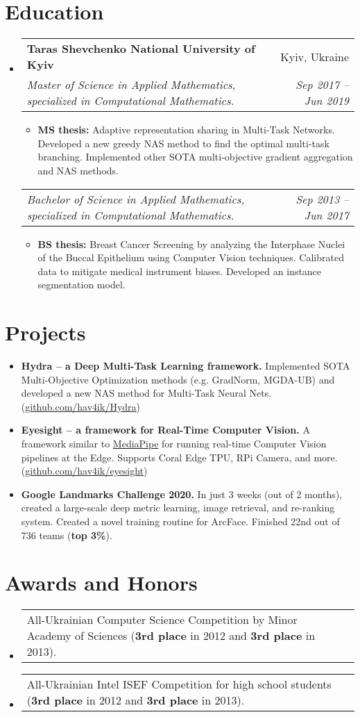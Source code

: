 \documentclass[letterpaper,11pt]{article}
\makeatletter
\newcommand{\resumeItemWithHeader}[2]{
  \item[--]\small{
    \textbf{#1}{ #2 \vspace{-2pt}}
  }
}
\newcommand{\awardsCustomItem}[2]{
  \item[--]
  \begin{tabular*}{0.97\textwidth}{l@{\extracolsep{\fill}}r}
    {\small#1} & \textit{\small#2} \\
  \end{tabular*}\vspace{-7.5pt}
}
\newcommand{\resumeSubheading}[4]{
  \vspace{-1pt}\item
    \begin{tabular*}{0.97\textwidth}{l@{\extracolsep{\fill}}r}
      \textbf{#1} & #2 \\
      \textit{\small#3} & \textit{\small #4} \\
    \end{tabular*}\vspace{-5pt}
}
\newcommand{\resumeSubheadingSection}[2]{
  \vspace{-1pt}
    \begin{tabular*}{0.97\textwidth}{l@{\extracolsep{\fill}}r}
      \textit{\small#1} & \textit{\small #2} \\
    \end{tabular*}\vspace{-5pt}
}
\newcommand{\resumeSubItem}[2]{\resumeItemWithHeader{#1}{#2}\vspace{-4pt}}
\newcommand{\resumeSubHeadingListStart}{\begin{itemize}[leftmargin=*]}
\newcommand{\resumeSubHeadingListEnd}{\end{itemize}}
\newcommand{\resumeItemListStart}{\begin{itemize}[leftmargin=*]}
\newcommand{\resumeItemListEnd}{\end{itemize}\vspace{-5pt}}
\makeatother
\begin{document}
\section{Education}
  \resumeSubHeadingListStart
    \resumeSubheading
      {Taras Shevchenko National University of Kyiv}{Kyiv, Ukraine}
      {Master of Science in Applied Mathematics, specialized in Computational Mathematics.}
      {Sep 2017 -- Jun 2019}
      \resumeItemListStart
        \resumeItemWithHeader{MS thesis:}{Adaptive representation sharing in Multi-Task Networks. Developed a new greedy NAS method to find the optimal multi-task branching. Implemented other SOTA multi-objective gradient aggregation and NAS methods.}
      \resumeItemListEnd
    \resumeSubheadingSection
      {Bachelor of Science in Applied Mathematics, specialized in Computational Mathematics.}
      {Sep 2013 -- Jun 2017}
      \resumeItemListStart
        \resumeItemWithHeader{BS thesis:}{Breast Cancer Screening by analyzing the Interphase Nuclei of the Buccal Epithelium using Computer Vision techniques. Calibrated data to mitigate medical instrument biases. Developed an instance segmentation model.}
      \resumeItemListEnd
  \resumeSubHeadingListEnd


\section{Projects}
  \resumeSubHeadingListStart
    \resumeSubItem{Hydra -- a Deep Multi-Task Learning framework.}
      {Implemented SOTA Multi-Objective Optimization methods (e.g. GradNorm, MGDA-UB) and developed a new NAS method for Multi-Task Neural Nets.  (\href{https://github.com/hav4ik/Hydra}{github.com/hav4ik/Hydra})}
    \resumeSubItem{Eyesight -- a framework for Real-Time Computer Vision.}
      {A framework similar to \href{https://google.github.io/mediapipe/}{MediaPipe} for running real-time Computer Vision pipelines at the Edge. Supports Coral Edge TPU, RPi Camera, and more. (\href{https://github.com/hav4ik/eyesight}{github.com/hav4ik/eyesight})}
    \resumeSubItem{Google Landmarks Challenge 2020.}{In just 3 weeks (out of 2 months), created a large-scale deep metric learning, image retrieval, and re-ranking system. Created a novel training routine for ArcFace. Finished 22nd out of 736 teams ({\bf top 3\%}).}
  \resumeSubHeadingListEnd


\section{Awards and Honors}
  \resumeSubHeadingListStart
    \awardsCustomItem
      {All-Ukrainian Computer Science Competition by Minor Academy of Sciences ({\bf 3rd place} in 2012 and {\bf 3rd place} in 2013).}{}
    \awardsCustomItem
      {All-Ukrainian Intel ISEF Competition for high school students ({\bf 3rd place} in 2012 and {\bf 3rd place} in 2013).}{}
  \resumeSubHeadingListEnd
\end{document}
